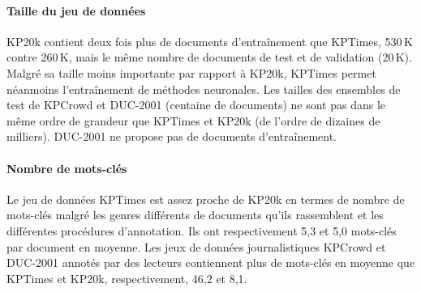 

\paragraph{Taille du jeu de données}
KP20k contient deux fois plus de documents d'entraînement que KPTimes, 530\,K contre 260\,K, mais le même nombre de documents de test et de validation (20\,K). Malgré sa taille moins importante par rapport à KP20k, KPTimes permet néanmoins l'entraînement de méthodes neuronales.
Les tailles des ensembles de test de KPCrowd et DUC-2001 (centaine de documents) ne sont pas dans le même ordre de grandeur que KPTimes et KP20k (de l'ordre de dizaines de milliers).
DUC-2001 ne propose pas de documents d'entraînement.



\paragraph{Nombre de mots-clés}

Le jeu de données KPTimes est assez proche de KP20k en termes de nombre de mots-clés malgré les genres différents de documents qu'ils rassemblent et les différentes procédures d'annotation. Ils ont respectivement 5,3 et 5,0 mots-clés par document en moyenne. Les jeux de données journalistiques KPCrowd et DUC-2001 annotés par des lecteurs contiennent plus de mots-clés en moyenne que KPTimes et KP20k, respectivement, 46,2 et 8,1.

